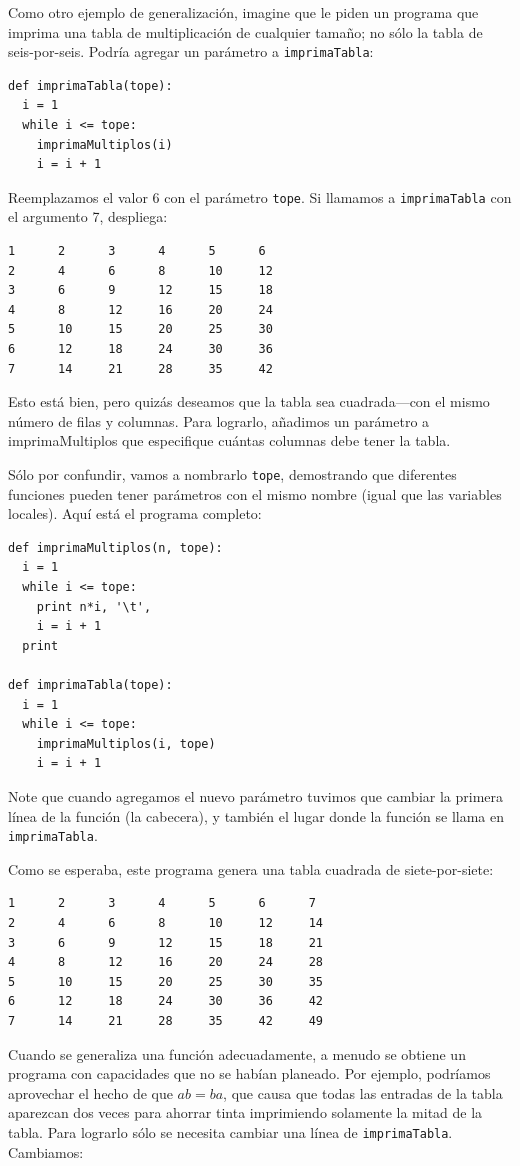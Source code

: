 Como otro ejemplo de  generalización, imagine que le piden
un programa que imprima una tabla de multiplicación 
de cualquier tamaño; no sólo la tabla de seis-por-seis. 
Podría agregar un parámetro a \texttt{imprimaTabla}:

\beforeverb
\begin{verbatim}
def imprimaTabla(tope):
  i = 1
  while i <= tope:
    imprimaMultiplos(i)
    i = i + 1
\end{verbatim}
\afterverb
%
Reemplazamos el valor 6 con el parámetro \texttt{tope}.  Si llamamos
a \texttt{imprimaTabla} con el  argumento 7, despliega:

\beforeverb
\begin{verbatim}
1      2      3      4      5      6
2      4      6      8      10     12
3      6      9      12     15     18
4      8      12     16     20     24
5      10     15     20     25     30
6      12     18     24     30     36
7      14     21     28     35     42
\end{verbatim}
\afterverb
%
Esto está bien, pero quizás deseamos que la tabla sea cuadrada---con
el mismo número de filas y  columnas.  Para lograrlo, añadimos un 
parámetro a imprimaMultiplos que especifique cuántas columnas 
debe tener la tabla.

Sólo por confundir, vamos a nombrarlo \texttt{tope}, demostrando
que diferentes funciones pueden tener parámetros con el mismo
nombre (igual que las variables locales). Aquí está el programa completo:

\beforeverb
\begin{verbatim}
def imprimaMultiplos(n, tope):
  i = 1
  while i <= tope:
    print n*i, '\t',
    i = i + 1
  print

def imprimaTabla(tope):
  i = 1
  while i <= tope:
    imprimaMultiplos(i, tope)
    i = i + 1
\end{verbatim}
\afterverb
%
Note que cuando agregamos el nuevo parámetro tuvimos que cambiar
la primera línea de la función (la cabecera), y también el lugar
donde la función se llama en \texttt{imprimaTabla}.

Como se esperaba, este programa genera una tabla cuadrada
de siete-por-siete:

\beforeverb
\begin{verbatim}
1      2      3      4      5      6      7
2      4      6      8      10     12     14
3      6      9      12     15     18     21
4      8      12     16     20     24     28
5      10     15     20     25     30     35
6      12     18     24     30     36     42
7      14     21     28     35     42     49
\end{verbatim}
\afterverb
%
Cuando se  generaliza una función adecuadamente, a menudo
se obtiene un programa con capacidades que no se habían 
planeado. Por ejemplo, podríamos aprovechar el hecho
de que $ab = ba$, que causa que todas las entradas de la
tabla aparezcan dos veces para ahorrar tinta
imprimiendo solamente la mitad de la tabla. Para lograrlo
sólo se necesita cambiar una línea de \texttt{imprimaTabla}.
Cambiamos:

